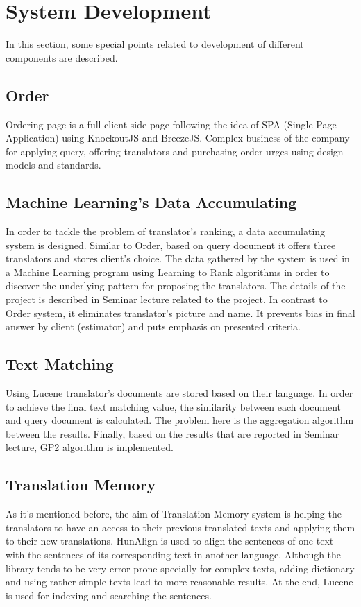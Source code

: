 \section{System Development}
In this section, some special points related to development of different components are described.

\subsection{Order}
Ordering page is a full client-side page following the idea of SPA (Single Page Application) using KnockoutJS and BreezeJS. Complex business of the company for applying query, offering translators and purchasing order urges using design models and standards.
\subsection{Machine Learning's Data Accumulating}
In order to tackle the problem of translator's ranking, a data accumulating system is designed. Similar to Order, based on query document it offers three translators and stores client's choice. The data gathered by the system is used in a Machine Learning program using Learning to Rank algorithms in order to discover the underlying pattern for proposing the translators. The details of the project is described in Seminar lecture related to the project. In contrast to Order system, it eliminates translator's picture and name. It prevents bias in final answer by client (estimator) and puts emphasis on presented criteria.
\subsection{Text Matching}
Using Lucene translator's documents are stored based on their language. In order to achieve the final text matching value, the similarity between each document and query document is calculated. The problem here is the aggregation algorithm between the results. Finally, based on the results that are reported in Seminar lecture, GP2\cite{gp2} algorithm is implemented.
\subsection{Translation Memory}
As it's mentioned before, the aim of Translation Memory system is helping the translators to have an access to their previous-translated texts and applying them to their new translations. HunAlign is used to align the sentences of one text with the sentences of its corresponding text in another language. Although the library tends to be very error-prone specially for complex texts, adding dictionary and using rather simple texts lead to more reasonable results. At the end, Lucene is used for indexing and searching the sentences.